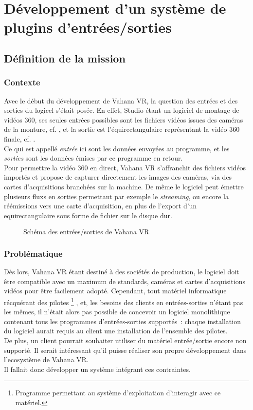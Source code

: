 \chapter{Développement d'un système de plugins d'entrées/sorties}

\section{Définition de la mission}
\subsection{Contexte}
Avec le début du développement de Vahana VR, la question des entrées et des sorties
du logicel s'était posée. En effet, Studio étant un logiciel de montage de vidéos
360, ses seules entrées possibles sont les fichiers vidéos issues des caméras de la monture,
cf. , et la sortie est l'équirectangulaire représentant
la vidéo 360 finale, cf. .\\
Ce qui est appellé \emph{entrée} ici sont les données envoyées au programme, et
les \emph{sorties} sont les données émises par ce programme en retour.\\
Pour permettre la vidéo 360 en direct, Vahana VR s'affranchit des fichiers
vidéos importés et propose de capturer directement les images des caméras, via
des cartes d'acquisitions branchées sur la machine. De même le logiciel peut émettre 
plusieurs fluxs en sorties permettant par exemple le \textit{streaming}, ou encore la réémissions vers
une carte d'acquisition, en plus de l'export d'un equirectangulaire sous forme de fichier
sur le disque dur.\\
\begin{figure}
  \centering
  \caption{Schéma des entrées/sorties de Vahana VR}
\end{figure}

\subsection{Problématique}
Dès lors, Vahana VR étant destiné à des sociétés de production, le logiciel doit
être compatible avec un maximum de standards, caméras et cartes d'acquisitions vidéos
pour être facilement adopté. Cependant, tout matériel informatique récquérant des pilotes
\footnote{Programme permettant au système d'exploitation d'interagir avec ce matériel\cite{pilote-informatique}.}
, et, les besoins des clients en entrées-sorties n'étant pas les mêmes, il n'était
alors pas possible de concevoir un logiciel monolithique contenant tous les programmes 
d'entrées-sorties supportés~: chaque installation du logiciel aurait requis au client 
une installation de l'ensemble des pilotes.\\
De plus, un client pourrait souhaiter utiliser du matériel entrée/sortie encore
non supporté. Il serait intéressant qu'il puisse réaliser son propre développement
dans l'ecosystème de Vahana VR.\\
Il fallait donc développer un système intégrant ces contraintes.\\

